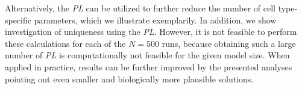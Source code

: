 \documentclass{bioinfo}
\begin{document}
\begin{methods}
Alternatively, the \emph{PL} can be utilized to further reduce the number of cell type-specific parameters, which we illustrate exemplarily.
In addition, we show investigation of uniqueness using the \emph{PL}.
However, it is not feasible to perform these calculations for each of the $N=500$ runs, because obtaining such a large number of \emph{PL} is computationally not feasible for the given model size.
When applied in practice, results can be further improved by the presented analyses pointing out even smaller and biologically more plausible solutions.


%
%
%
%
%
%

\end{methods}
\end{document}
